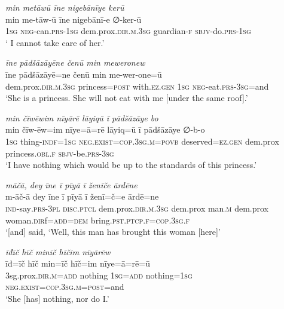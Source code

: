 \ea \label{ZP.103}
\textit{min metāwū īne nigebānīye kerū} \\ 
\gll min me-tāw-ū īne nigebānī-e ∅-ker-ū \\ 
 \textsc{1sg} \textsc{neg-}can\textsc{.prs}\textsc{-\textsc{1sg}} dem.prox\textsc{.dir}\textsc{.m}\textsc{.3sg} guardian\textsc{-f} \textsc{sbjv-}do\textsc{.prs}\textsc{-\textsc{1sg}} \\ 
\glt ` I cannot take care of her.'
\z 
 
\ea \label{ZP.104}
\textit{īne pādšāzāyēne čenū min meweronew} \\ 
\gll īne pādšāzāyē=ne čenū min me-wer-one=ū \\ 
 dem.prox\textsc{.dir}\textsc{.m}\textsc{.3sg} princess\textsc{=\textsc{post}} with\textsc{.ez.gen} \textsc{1sg} \textsc{neg-}eat\textsc{.prs}\textsc{-3sg}=and \\ 
\glt `She is a princess. She will not eat with me [under the same roof].'
\z 
 
\ea \label{ZP.105}
\textit{min čīwēwim nīyārē lāyiqū ī pādšāzāye bo} \\ 
\gll min čīw-ēw=im nīye=ā=rē lāyiq=ū ī pādšāzāye ∅-b-o \\ 
 \textsc{1sg} thing\textsc{-indf}\textsc{=\textsc{1sg}} \textsc{\textsc{neg.}exist}\textsc{=cop}\textsc{.3sg}\textsc{.m}\textsc{=\textsc{povb}} deserved\textsc{\textsc{=ez.gen}} dem.prox princess\textsc{.obl}\textsc{.f} \textsc{sbjv-}be\textsc{.prs}\textsc{-3sg} \\ 
\glt `I have nothing which would be up to the standards of this princess.'
\z 
 
\ea \label{ZP.115}
\textit{māčā, dey īne ī pīyā ī ženīče ārdēne} \\ 
\gll m-āč-ā dey īne ī pīyā ī ženī=č=e ārdē=ne \\ 
 \textsc{ind-}say\textsc{.prs}\textsc{-3pl} \textsc{disc.ptcl} dem.prox\textsc{.dir}\textsc{.m}\textsc{.3sg} dem.prox man\textsc{.m} dem.prox woman\textsc{.dir}f\textsc{=add}\textsc{=dem} bring\textsc{.pst}\textsc{.ptcp}\textsc{.f}\textsc{=cop}\textsc{.3sg}\textsc{.f} \\ 
\glt `[and] said, ‘Well, this man has brought this woman [here]'
\z 
 
\ea \label{ZP.117}
\textit{īđīč hīč minīč hīčim nīyārēw} \\ 
\gll īđ=īč hīč min=īč hīč=im nīye=ā=rē=ū \\ 
 3sg.prox\textsc{.dir}\textsc{.m}\textsc{=add} nothing \textsc{1sg}\textsc{=add} nothing\textsc{=\textsc{1sg}} \textsc{\textsc{neg.}exist}\textsc{=cop}\textsc{.3sg}\textsc{.m}\textsc{=\textsc{post}}=and \\ 
\glt `She [has] nothing, nor do I.'
\z 
 
